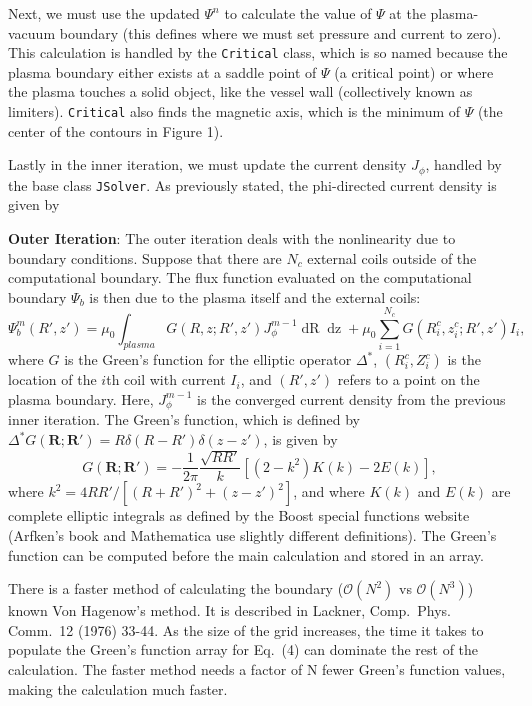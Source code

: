 \documentclass[paper=letter, fontsize=11pt]{scrartcl} %
\begin{document}
Next, we must use the updated $\Psi^n$ to calculate the value of $\Psi$ at the plasma-vacuum boundary (this defines where we must set pressure and current to zero).  This calculation is handled by the \texttt{Critical} class, which is so named because the plasma boundary either exists at a saddle point of $\Psi$ (a critical point) or where the plasma touches a solid object, like the vessel wall (collectively known as limiters).  \texttt{Critical} also finds the magnetic axis, which is the minimum of $\Psi$ (the center of the contours in Figure 1).  

Lastly in the inner iteration, we must update the current density $J_{\phi}$, handled by the base class \texttt{JSolver}.  As previously stated, the phi-directed current density is given by 

\textbf{Outer Iteration}: The outer iteration deals with the nonlinearity due to boundary conditions.  Suppose that there are $N_c$ external coils outside of the computational boundary.  The flux function evaluated on the computational boundary $\Psi_b$ is then due to the plasma itself and the external coils:
\begin{equation}
\Psi^m_b (R',z') = \mu_0 \int_{plasma} G(R,z; R',z') J_{\phi}^{m-1} \mathop{dR} \mathop{dz} + \mu_0 \sum_{i=1}^{N_c} G(R_i^c,z_i^c; R',z') I_i,
\end{equation}
where $G$ is the Green's function for the elliptic operator $\Delta^{*}$, $(R_i^c,Z_i^c)$ is the location of the $i$th coil with current $I_i$, and $(R',z')$ refers to a point on the plasma boundary. Here, $J_{\phi}^{m-1}$ is the converged current density from the previous inner iteration.  The Green's function, which is defined by $\Delta^{*}G(\mathbf{R};\mathbf{R'}) = R \delta(R-R')\delta(z-z')$, is given by
\begin{equation}
G(\mathbf{R};\mathbf{R'}) = -\frac{1}{2\pi} \frac{\sqrt{RR'}}{k} [(2-k^2) K(k) - 2 E(k)], 
\end{equation} 
where $k^2 = 4RR'/[(R+R')^2+(z-z')^2]$, and where $K(k)$ and $E(k)$ are complete elliptic integrals as defined by the Boost special functions website (Arfken's book and Mathematica use slightly different definitions). The Green's function can be computed before the main calculation and stored in an array.


There is a faster method of calculating the boundary ($\mathcal{O}(N^2)$ vs $\mathcal{O}(N^3)$) known Von Hagenow's method. It is described in Lackner, Comp.~Phys. Comm.~12 (1976) 33-44.  As the size of the grid increases, the time it takes to populate the Green's function array for Eq.~(4) can dominate the rest of the calculation.  The faster method needs a factor of N fewer Green's function values, making the calculation much faster.    
\end{document}
